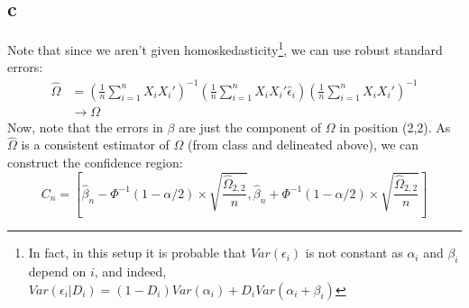 \documentclass{article}
\begin{document}
\subsection*{c}
Note that since we aren't given homoskedasticity\footnote{In fact, in this setup it is probable that $Var(\epsilon_i)$ is not constant as $\alpha_i$ and $\beta_i$ depend on $i$, and indeed, $Var(\epsilon_i|D_i) = (1-D_i)Var(\alpha_i) + D_iVar(\alpha_i + \beta_i)$}, we can use robust standard errors:
\begin{align*}
    \hat \Omega &= (\frac{1}{n}\sum_{i=1}^n X_i X_i')^{-1}(\frac{1}{n}\sum_{i=1}^n X_i X_i' \hat \epsilon_i)(\frac{1}{n}\sum_{i=1}^n X_i X_i')^{-1} \\
    & \rightarrow \Omega
\end{align*}
Now, note that the errors in $\beta$ are just the component of $\Omega$ in position (2,2). As $\hat \Omega$ is a consistent estimator of $\Omega$ (from class and delineated above), we can construct the confidence region:
$$C_n = [\hat \beta_n - \Phi^{-1}({1-\alpha/2})\times \sqrt{\frac{\hat \Omega_{2,2}}{n}}, \hat \beta_n +  \Phi^{-1}({1-\alpha/2})\times \sqrt{\frac{\hat \Omega_{2,2}}{n}}]  $$
\end{document}

